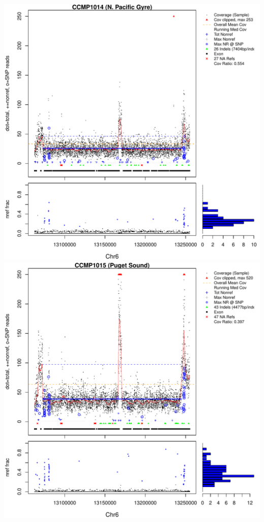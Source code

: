 \documentclass{article}\usepackage[]{graphicx}\usepackage[]{color}
\makeatletter
\def\maxwidth{ %
  \ifdim\Gin@nat@width>\linewidth
    \linewidth
  \else
    \Gin@nat@width
  \fi
}
\newenvironment{knitrout}{}{} %
\makeatother
\begin{document}
\begin{knitrout}
{\includegraphics[width=\maxwidth]{figs-knitr/unnamed-chunk-39-5} 
\includegraphics[width=\maxwidth]{figs-knitr/unnamed-chunk-39-6} 
}
\end{knitrout}
\end{document}
